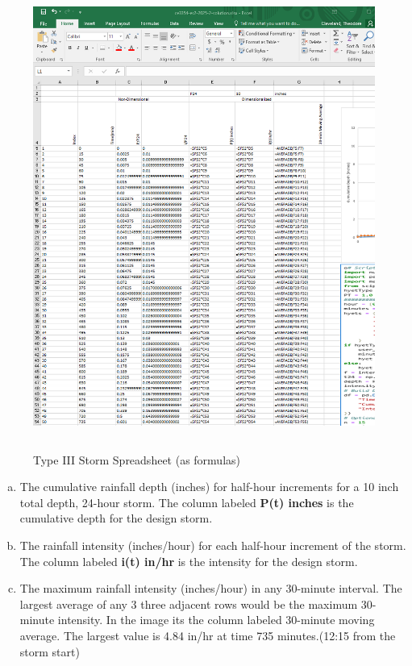\documentclass[12pt]{article}
\begin{document}
\begin{enumerate}
\begin{figure}[h!] %
   \centering
   \includegraphics[height=6in]{ES2-6-formulas.png} 
   \caption{Type III Storm Spreadsheet (as formulas)}
   \label{fig:es2-6-form}
\end{figure}
\clearpage

\begin{enumerate}[a)]
        \item The cumulative rainfall depth (inches) for half-hour increments for a 10 inch total depth, 24-hour storm. The column labeled \textbf{P(t) inches} is the cumulative depth for the design storm.
        \item The rainfall intensity (inches/hour) for each half-hour increment of the storm. The column labeled \textbf{i(t) in/hr} is the intensity for the design storm.
        \item The maximum rainfall intensity (inches/hour) in any 30-minute interval.  The largest average of any 3 three adjacent rows would be the maximum 30-minute intensity.  In the image its the column labeled 30-minute moving average.  The largest value is 4.84 in/hr at time 735 minutes.(12:15 from the storm start)
    \end{enumerate}


\end{enumerate}
\end{document}
